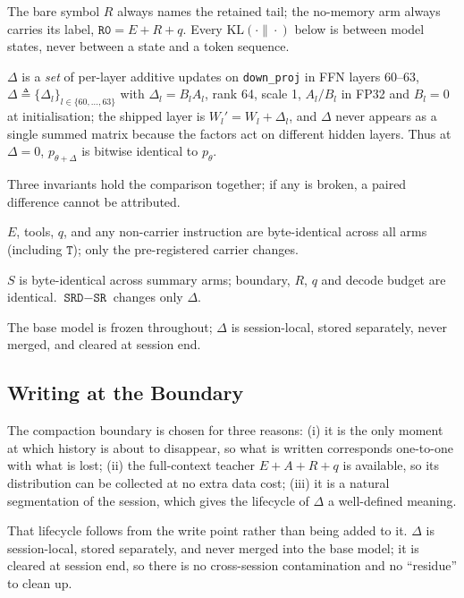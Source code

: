 \documentclass[sigconf,nonacm]{acmart}
\newcommand{\KL}{\mathrm{KL}}
\newcommand{\St}{\texttt{SR}}
\newcommand{\Sd}{\texttt{SRD}}
\newcommand{\armT}{\texttt{T}}
\newcommand{\armR}{\texttt{R0}}
\begin{document}
The bare symbol $R$ always names the retained tail; the no-memory arm always carries its label,
$\armR{}=E{+}R{+}q$. Every $\KL(\cdot\|\cdot)$ below is between model states, never between a state and a
token sequence.

$\Delta$ is a \emph{set} of per-layer additive updates on \texttt{down\_proj} in FFN layers 60--63,
$\Delta\triangleq\{\Delta_l\}_{l\in\{60,\dots,63\}}$ with $\Delta_l=B_lA_l$, rank 64, scale 1, $A_l/B_l$ in
FP32 and $B_l{=}0$ at initialisation; the shipped layer is $W_l' = W_l + \Delta_l$, and $\Delta$ never appears
as a single summed matrix because the factors act on different hidden layers. Thus at $\Delta=0$,
$p_{\theta+\Delta}$ is bitwise identical to $p_\theta$.

Three invariants hold the comparison together; if any is broken, a paired difference cannot be attributed.
\begin{description}[leftmargin=1.2em]
\item[I1 Carriers differ, non-carriers are identical.] $E$, tools, $q$, and any non-carrier instruction are
byte-identical across all arms (including $\armT$); only the pre-registered carrier changes.
\item[I2 Shared carrier components are held fixed.] $S$ is byte-identical across summary arms; boundary, $R$,
$q$ and decode budget are identical. $\Sd-\St$ changes only $\Delta$.
\item[I3 Lifecycle.] The base model is frozen throughout; $\Delta$ is session-local, stored separately, never
merged, and cleared at session end.
\end{description}

\subsection{Writing at the Boundary}

The compaction boundary is chosen for three reasons: (i) it is the only moment at which history is about
to disappear, so what is written corresponds one-to-one with what is lost; (ii) the full-context teacher
$E{+}A{+}R{+}q$ is available, so its distribution can be collected at no extra data cost; (iii) it is a
natural segmentation of the session, which gives the lifecycle of $\Delta$ a well-defined meaning.

That lifecycle follows from the write point rather than being added to it. $\Delta$ is session-local, stored
separately, and never merged into the base model; it is cleared at session end, so there is no cross-session
contamination and no ``residue'' to clean up.
\end{document}
